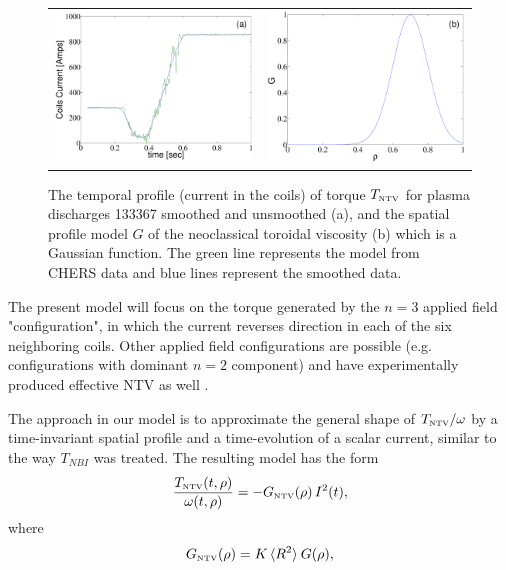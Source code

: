 \documentclass[12pt]{iopart}
\begin{document}
\begin{figure}
  \begin{tabular}{cc}
     \includegraphics[width=0.5\linewidth]{imene_figs/current} &
   \includegraphics[width=0.5\linewidth]{imene_figs/gauss1}
  \end{tabular} 
\caption{ The temporal profile (current  in the coils) of torque $T_\textrm{\tiny{NTV}}$ for plasma discharges 133367 smoothed and unsmoothed (a), and the  spatial profile model $G$ of the neoclassical toroidal viscosity (b)  which is a Gaussian function. The green line represents the model from CHERS data and  blue lines represent the smoothed data.}
  \label{fig:current}
\end{figure}
The present model  will focus on the torque generated by the $n=3$ applied field "configuration", in which the current reverses direction in each of the six neighboring coils. Other applied field configurations are possible (e.g. configurations with dominant $n = 2$ component) and have experimentally produced effective NTV as well \cite{Sabbagh10}.
 
The approach in our model is to approximate the general shape of $T_\textrm{\tiny{NTV}}/\omega$ by a time-invariant spatial profile and a time-evolution of a scalar current, similar to the way $T_{NBI}$ was treated. The resulting model has the form  
\begin{equation}
   \frac{T_\textrm{\tiny{NTV}}(t,\rho)}{\omega(t,\rho)} = - G_\textrm{\tiny NTV}  (\rho) \, I^2(t),
\end{equation}
where
\begin{equation}
G_\textrm{\tiny NTV}  (\rho) = K \,  \langle R^2 \rangle \:G(\rho),
\end{equation}
\end{document}
